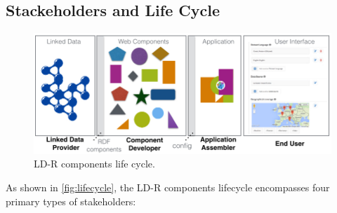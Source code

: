 \documentclass{acm_proc_article-sp}
\begin{document}
\subsection{Stackeholders and Life Cycle}
\begin{figure}[tb]
  \includegraphics[width=1\linewidth]{images/lifecycle.jpg}
  \caption{LD-R components life cycle.}
  \label{fig:lifecycle}
\end{figure}

As shown in \autoref{fig:lifecycle}, the LD-R components lifecycle encompasses four primary types of stakeholders:
\end{document}
